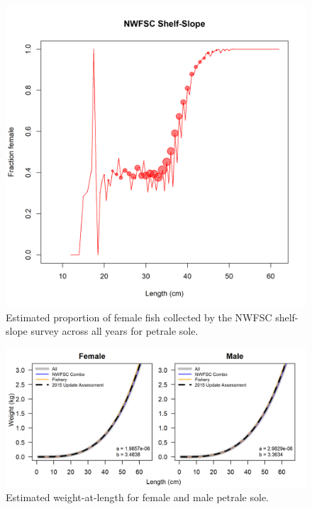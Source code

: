 \documentclass[12pt,]{article}
\begin{document}
\FloatBarrier

\begin{figure}
\centering
\includegraphics{Figures/NWFSC Shelf-Slope_length_fraction_female.png}
\caption{Estimated proportion of female fish collected by the NWFSC
shelf-slope survey across all years for petrale sole.
\label{fig:sex_ratio}}
\end{figure}

\FloatBarrier

\begin{figure}
\centering
\includegraphics{Figures/weightAtLengthPred.png}
\caption{Estimated weight-at-length for female and male petrale sole.
\label{fig:wt_length}}
\end{figure}
\end{document}
